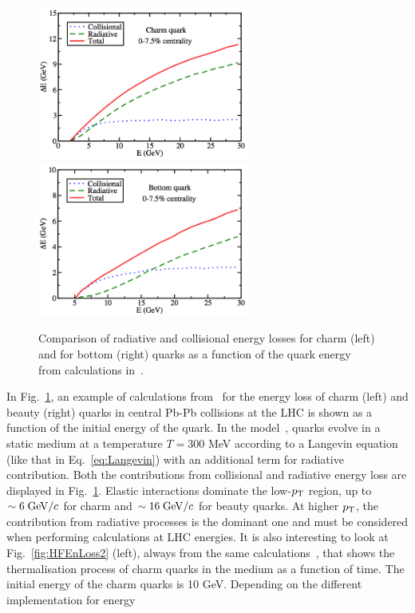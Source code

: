 \begin{figure}[!ht]
  \centering
  \includegraphics[width=7cm]{FigCap2/HFEnLoss1.png}
  \includegraphics[width=7cm]{FigCap2/HFEnLoss2.png}
  \caption{Comparison of radiative and collisional energy losses for charm (left) and for bottom (right) quarks as a function of the quark energy from calculations in~\cite{Cao:2013ita}.}
  \label{fig:HFEnLoss}
\end{figure}
In Fig.~\ref{fig:HFEnLoss}, an example of calculations from~\cite{Cao:2013ita}
for the energy loss of charm (left) and beauty (right) quarks 
in central Pb-Pb collisions at the LHC is shown as a function of the initial energy of the quark.
In the model~\cite{Cao:2013ita}, quarks evolve in a static medium at a temperature
$T = 300$ MeV according to a Langevin equation (like that in Eq.~\ref{eq:Langevin}) with 
an additional term for radiative contribution. 
Both the contributions from collisional and radiative energy loss 
are displayed in Fig.~\ref{fig:HFEnLoss}. Elastic interactions
dominate the low-$p_{\rm T}$ region, up to $\sim 6\; \mathrm{GeV}/c$ for charm and $\sim 16 \;\mathrm{GeV}/c$ for beauty quarks.
At higher $p_{\rm T}$, the contribution from radiative processes is the dominant one and must be considered when 
performing calculations at LHC energies.
It is also interesting to look at Fig.~\ref{fig:HFEnLoss2} (left), always from the
same calculations~\cite{Cao:2013ita}, that shows the 
thermalisation process of charm quarks in the medium as a function of time.
The initial energy of the charm quarks is 10 GeV. Depending on the different implementation for energy
